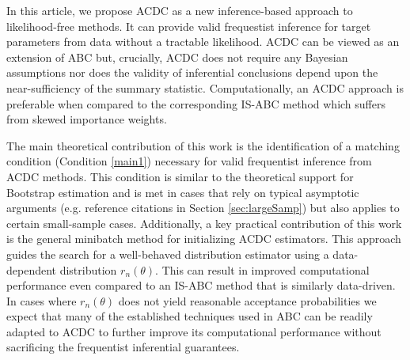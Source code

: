 

In this article, we propose ACDC as a new inference-based approach to likelihood-free methods. It can provide valid frequestist inference for target parameters from data without a tractable likelihood.
ACDC can be viewed as an extension of ABC but, crucially, ACDC does not require any Bayesian assumptions nor does the validity of inferential conclusions depend upon the near-sufficiency of the summary statistic. Computationally, an ACDC approach %
is preferable when compared to the corresponding IS-ABC method which suffers from skewed importance weights.%

The main theoretical contribution of this work %
is the identification of a matching condition (Condition \ref{main1}) necessary for valid frequentist inference from ACDC methods. This condition is similar to the theoretical support for Bootstrap estimation and is met in cases that rely on typical asymptotic arguments (e.g. reference citations in Section \ref{sec:largeSamp}) but also applies to certain small-sample cases.
Additionally, a key practical contribution of this work %
is the general minibatch method for initializing ACDC estimators.
This approach guides the search for a well-behaved distribution estimator using a data-dependent distribution $r_{n}(\theta)$. This can result in improved computational performance even compared to an IS-ABC method that is similarly data-driven.
In cases where $r_{n}(\theta)$ does not yield reasonable acceptance probabilities %
we expect that many of the established techniques used in ABC can be readily adapted to ACDC to further improve its computational performance without sacrificing the frequentist inferential guarantees. 


